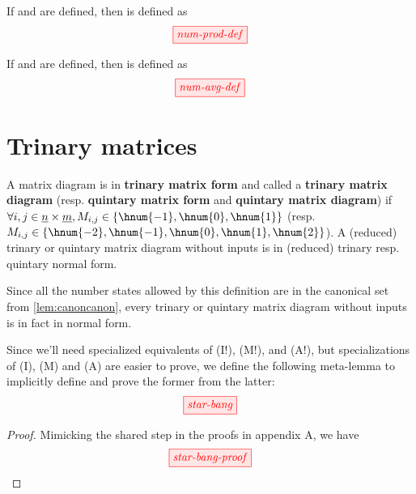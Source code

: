 \begin{definition}
    If  and  are defined, then  is defined as
    $$\tikzfig{num-prod-def}$$
\end{definition}

\begin{definition}
    If  and  are defined, then  is defined as
    $$\tikzfig{num-avg-def}$$
\end{definition}


\section{Trinary matrices}

\begin{definition}
    A matrix diagram  is in \textbf{trinary matrix
    form} and called a \textbf{trinary matrix diagram} (resp. \textbf{quintary
    matrix form} and \textbf{quintary matrix diagram}) if $\forall i,j \in
    \underline{n} \times \underline{m}, M_{i,j} \in \left\{\hnum{-1},
    \hnum{0},\hnum{1}\right\}$ (resp. $M_{i,j} \in \left\{\hnum{-2},\hnum{-1},
    \hnum{0},\hnum{1},\hnum{2}\right\}$). A (reduced) trinary or quintary matrix
    diagram without inputs is in (reduced) trinary resp. quintary normal form.
\end{definition}
\begin{remark}
    Since all the number states allowed by this definition are in the canonical
    set from \autoref{lem:canoncanon}, every trinary or quintary matrix diagram
    without inputs is in fact in normal form.
\end{remark}

\begin{lemma}\label{lem:star-bang}
    Since we'll need specialized equivalents of (I!), (M!), and (A!), but
    specializations of (I), (M) and (A) are easier to prove, we define the
    following meta-lemma to implicitly define and prove the former from the
    latter:
    $$\tikzfig{star-bang}$$
\end{lemma}
\begin{proof}
    Mimicking the shared step in the proofs in \cite{backens2018zhcalculus}
    appendix A, we have
    $$\tikzfig{star-bang-proof}$$
\end{proof}

